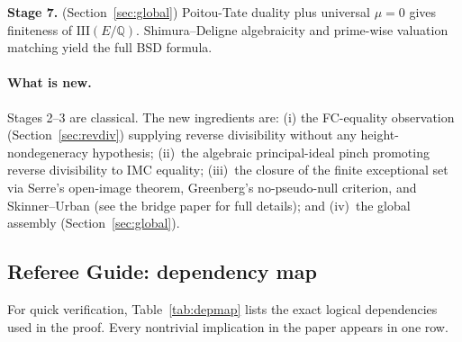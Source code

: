 \documentclass[12pt,reqno]{amsart}
\theoremstyle{definition}
\theoremstyle{remark}
\newcommand{\Q}{\mathbb{Q}}
\newcommand{\Sha}{\mathrm{III}}
\newcommand{\ShaE}{\Sha(E/\Q){}}
\begin{document}
\noindent\textbf{Stage 7.} (Section~\ref{sec:global}) Poitou-Tate duality plus universal $\mu=0$ gives finiteness of $\ShaE$.  Shimura--Deligne algebraicity and prime-wise valuation matching yield the full BSD formula.

\paragraph{What is new.}
Stages 2--3 are classical.
The new ingredients are: (i) the FC-equality observation (Section~\ref{sec:revdiv}) supplying reverse divisibility without any height-nondegeneracy hypothesis; (ii)~the algebraic principal-ideal pinch \cite{F5} promoting reverse divisibility to IMC equality; (iii)~the closure of the finite exceptional set via Serre's open-image theorem, Greenberg's no-pseudo-null criterion, and Skinner--Urban (see the bridge paper \cite{F7} for full details); and (iv)~the global assembly (Section~\ref{sec:global}).

\subsection*{Referee Guide: dependency map}
For quick verification, Table~\ref{tab:depmap} lists the exact logical dependencies used in the proof.
Every nontrivial implication in the paper appears in one row.
\end{document}
